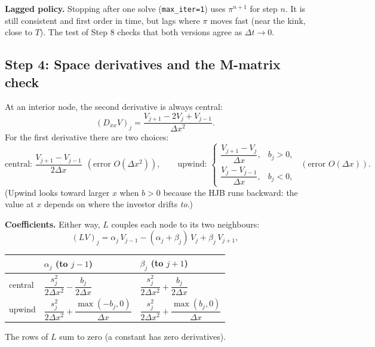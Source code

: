 \documentclass[11pt]{article}
\begin{document}
\textbf{Lagged policy.} Stopping after one solve (\texttt{max\_iter=1}) uses $\pi^{n+1}$ for
step $n$. It is still consistent and first order in time, but lags where $\pi$ moves fast
(near the kink, close to $T$). The test of Step 8 checks that both versions agree as
$\Delta t\to0$.

\subsection*{Step 4: Space derivatives and the M-matrix check}
At an interior node, the second derivative is always central:
\[
  (D_{xx}V)_j = \frac{V_{j+1}-2V_j+V_{j-1}}{\Delta x^2}.
\]
For the first derivative there are two choices:
\[
  \text{central: } \frac{V_{j+1}-V_{j-1}}{2\Delta x}\ \ (\text{error }O(\Delta x^2)),
  \qquad
  \text{upwind: } \begin{cases}\dfrac{V_{j+1}-V_j}{\Delta x}, & b_j>0,\\[8pt]
                                \dfrac{V_j-V_{j-1}}{\Delta x}, & b_j<0,\end{cases}
  \ \ (\text{error }O(\Delta x)).
\]
(Upwind looks toward larger $x$ when $b>0$ because the HJB runs backward: the value at $x$
depends on where the investor drifts \emph{to}.)

\textbf{Coefficients.} Either way, $L$ couples each node to its two neighbours:
\[
  (LV)_j = \alpha_j\,V_{j-1} - (\alpha_j+\beta_j)\,V_j + \beta_j\,V_{j+1},
\]
\begin{center}
\begin{tabular}{@{}lll@{}}
\toprule
 & $\alpha_j$ (to $j-1$) & $\beta_j$ (to $j+1$) \\
\midrule
central & $\dfrac{s_j^2}{2\Delta x^2}-\dfrac{b_j}{2\Delta x}$
        & $\dfrac{s_j^2}{2\Delta x^2}+\dfrac{b_j}{2\Delta x}$ \\[10pt]
upwind  & $\dfrac{s_j^2}{2\Delta x^2}+\dfrac{\max(-b_j,0)}{\Delta x}$
        & $\dfrac{s_j^2}{2\Delta x^2}+\dfrac{\max(b_j,0)}{\Delta x}$ \\
\bottomrule
\end{tabular}
\end{center}
The rows of $L$ sum to zero (a constant has zero derivatives).
\end{document}
